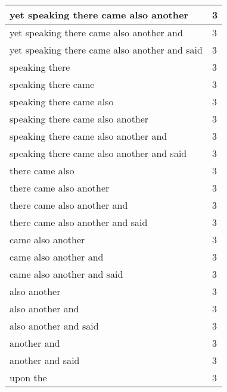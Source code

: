 \begin{center}
\begin{longtable}{|p{3.0in}|p{0.5in}|}
yet speaking there came also another & 3\\ \hline 
yet speaking there came also another and & 3\\ \hline 
yet speaking there came also another and said & 3\\ \hline 
speaking there & 3\\ \hline 
speaking there came & 3\\ \hline 
speaking there came also & 3\\ \hline 
speaking there came also another & 3\\ \hline 
speaking there came also another and & 3\\ \hline 
speaking there came also another and said & 3\\ \hline 
there came also & 3\\ \hline 
there came also another & 3\\ \hline 
there came also another and & 3\\ \hline 
there came also another and said & 3\\ \hline 
came also another & 3\\ \hline 
came also another and & 3\\ \hline 
came also another and said & 3\\ \hline 
also another & 3\\ \hline 
also another and & 3\\ \hline 
also another and said & 3\\ \hline 
another and & 3\\ \hline 
another and said & 3\\ \hline 
upon the & 3\\ \hline 
\end{longtable}
\end{center}





